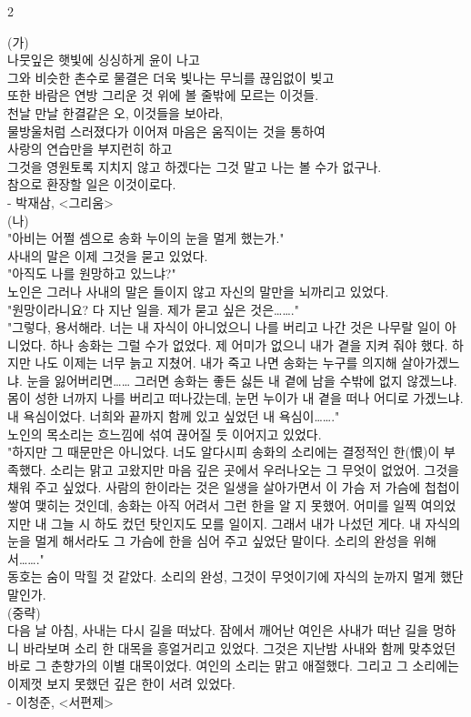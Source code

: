 \documentclass[10pt, a4paper]{article}
\begin{document}
\begin{multicols}{2}
\begin{passagebox}
\noindent{}(가) \\
나뭇잎은 햇빛에 싱싱하게 윤이 나고 \\
그와 비슷한 촌수로 물결은 더욱 빛나는 무늬를 끊임없이 빚고 \\
또한 바람은 연방 그리운 것 위에 볼 줄밖에 모르는 이것들. \\
천날 만날 한결같은 오, 이것들을 보아라, \\
물방울처럼 스러졌다가 이어져 마음은 움직이는 것을 통하여 \\
사랑의 연습만을 부지런히 하고 \\
그것을 영원토록 지치지 않고 하겠다는 그것 말고 나는 볼 수가 없구나. \\
참으로 환장할 일은 이것이로다.
\\[0.5em]
- 박재삼, <그리움>
\\[0.5em]
(나) \\
"아비는 어쩔 셈으로 송화 누이의 눈을 멀게 했는가." \\
사내의 말은 이제 그것을 묻고 있었다. \\
"아직도 나를 원망하고 있느냐?" \\
노인은 그러나 사내의 말은 들이지 않고 자신의 말만을 뇌까리고 있었다. \\
"원망이라니요? 다 지난 일을. 제가 묻고 싶은 것은……." \\
"그렇다, 용서해라. 너는 내 자식이 아니었으니 나를 버리고 나간 것은 나무랄 일이 아니었다. 하나 송화는 그럴 수가 없었다. 제 어미가 없으니 내가 곁을 지켜 줘야 했다. 하지만 나도 이제는 너무 늙고 지쳤어. 내가 죽고 나면 송화는 누구를 의지해 살아가겠느냐. 눈을 잃어버리면…… 그러면 송화는 좋든 싫든 내 곁에 남을 수밖에 없지 않겠느냐. 몸이 성한 너까지 나를 버리고 떠나갔는데, 눈먼 누이가 내 곁을 떠나 어디로 가겠느냐. 내 욕심이었다. 너희와 끝까지 함께 있고 싶었던 내 욕심이……." \\
노인의 목소리는 흐느낌에 섞여 끊어질 듯 이어지고 있었다. \\
"하지만 그 때문만은 아니었다. 너도 알다시피 송화의 소리에는 결정적인 한(恨)이 부족했다. 소리는 맑고 고왔지만 마음 깊은 곳에서 우러나오는 그 무엇이 없었어. 그것을 채워 주고 싶었다. 사람의 한이라는 것은 일생을 살아가면서 이 가슴 저 가슴에 첩첩이 쌓여 맺히는 것인데, 송화는 아직 어려서 그런 한을 알 지 못했어. 어미를 일찍 여의었지만 내 그늘 시 하도 컸던 탓인지도 모를 일이지. 그래서 내가 나섰던 게다. 내 자식의 눈을 멀게 해서라도 그 가슴에 한을 심어 주고 싶었단 말이다. 소리의 완성을 위해서……." \\
동호는 숨이 막힐 것 같았다. 소리의 완성, 그것이 무엇이기에 자식의 눈까지 멀게 했단 말인가. \\
(중략) \\
다음 날 아침, 사내는 다시 길을 떠났다. 잠에서 깨어난 여인은 사내가 떠난 길을 멍하니 바라보며 소리 한 대목을 흥얼거리고 있었다. 그것은 지난밤 사내와 함께 맞추었던 바로 그 춘향가의 이별 대목이었다. 여인의 소리는 맑고 애절했다. 그리고 그 소리에는 이제껏 보지 못했던 깊은 한이 서려 있었다.
\\[0.5em]
- 이청준, <서편제>
\end{passagebox}
\vspace{1mm}


\end{multicols}
\end{document}
